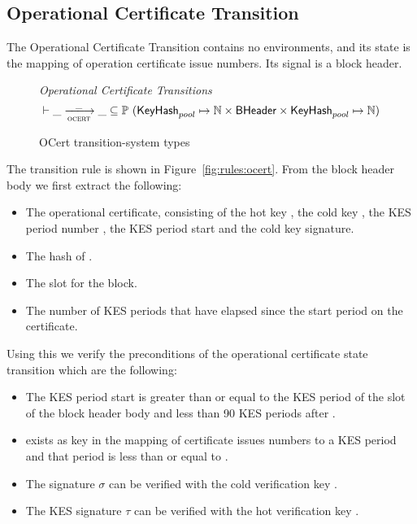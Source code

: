 \clearpage

\subsection{Operational Certificate Transition}
\label{sec:oper-cert-trans}

The Operational Certificate Transition contains no environments, and its state is the mapping of
operation certificate issue numbers.  Its signal is a block header.

\begin{figure}
  \emph{Operational Certificate Transitions}
  \begin{equation*}
    \vdash \var{\_} \trans{ocert}{\_} \var{\_} \subseteq
    \powerset (\KeyHash_{pool} \mapsto \N \times \BHeader \times \KeyHash_{pool} \mapsto \N)
  \end{equation*}
  \caption{OCert transition-system types}
  \label{fig:ts-types:ocert}
\end{figure}

The transition rule is shown in Figure~\ref{fig:rules:ocert}. From the block
header body  we first extract the following:

\begin{itemize}
  \item The operational certificate, consisting of the hot key , the cold key
    , the KES period number , the KES period start  and the cold key
  signature.
\item The hash  of .
\item The slot  for the block.
\item The number of KES periods that have elapsed since the start period on the certificate.
\end{itemize}

Using this we verify the preconditions of the operational certificate state
transition which are the following:

\begin{itemize}
\item The KES period start  is greater than or equal to the KES period of
  the slot of the block header body and less than 90 KES periods after .
\item {} exists as key in the mapping of certificate issues numbers to a KES
  period  and that period is less than or equal to .
\item The signature $\sigma$ can be verified with the cold verification key
  .
\item The KES signature $\tau$ can be verified with the hot verification key
  .
\end{itemize}

